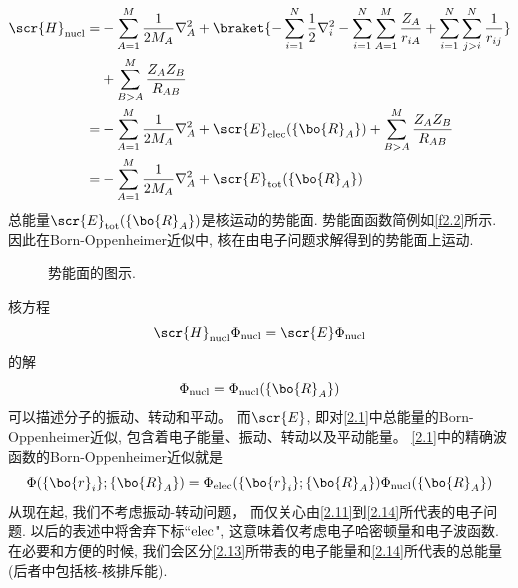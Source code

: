 \begin{equation}
\begin{split}
\scr{H}_{\rm nucl}= &- \sum_{A=1}^{M}\frac{1}{2M_A}\nabla_A^2 + \braket{-\sum_{i=1}^{N}\frac{1}{2}\nabla_i^2 - \sum_{i=1}^{N}\sum_{A=1}^{M}\frac{Z_A}{r_{iA}} + \sum_{i=1}^{N}\sum_{j>i}^{N}\frac{1}{r_{ij}}}\\
& + \sum_{B>A}^M\frac{Z_AZ_B}{R_{AB}}\\
= & - \sum_{A=1}^{M}\frac{1}{2M_A}\nabla_A^2 + \scr{E}_{\rm elec}(\{\bo{R}_A\}) + \sum_{B>A}^M\frac{Z_AZ_B}{R_{AB}}\\
= & - \sum_{A=1}^{M}\frac{1}{2M_A}\nabla_A^2 + \scr{E}_{\rm tot}(\{\bo{R}_A\})
\end{split}
\end{equation}
总能量$ \scr{E}_{\rm tot}(\{\bo{R}_A\}) $是核运动的势能面. 
势能面函数简例如\autoref{f2.2}所示. 
因此在Born-Oppenheimer近似中, 
核在由电子问题求解得到的势能面上运动. 

\begin{figure}[ht]
	\def\FunctionA(#1){180*((0.6/(#1+.5))^(12) -(0.6/(#1+ .5))^(6)) + 60}
	\def\FunctionF(#1){(#1)^3- 3*(#1)}
	\caption{势能面的图示.}
	\label{f2.2}
\end{figure}
核\sch 方程
\begin{equation}
\scr{H}_{\rm nucl}\Phi_{\rm nucl} = \scr{E}\Phi_{\rm nucl}
\end{equation}的解
\begin{equation}
\Phi_{\rm nucl}=\Phi_{\rm nucl}(\{\bo{R}_A\})
\end{equation}
可以描述分子的振动、转动和平动。
而$\scr{E}$, 
即对\autoref{2.1}中总能量的Born-Oppenheimer近似,
包含着电子能量、振动、转动以及平动能量。
\autoref{2.1}中的精确波函数的Born-Oppenheimer近似就是
\begin{equation}
\Phi(\{\bo{r}_i\};\{\bo{R}_A\}) = \Phi_{\rm elec}(\{\bo{r}_i\};\{\bo{R}_A\})\Phi_{\rm nucl}(\{\bo{R}_A\})
\end{equation}
从现在起,
我们不考虑振动-转动问题，
而仅关心由\autoref{2.11}到\autoref{2.14}所代表的电子问题.
以后的表述中将舍弃下标``$\rm elec$", 
这意味着仅考虑电子哈密顿量和电子波函数. 
在必要和方便的时候, 
我们会区分\autoref{2.13}所带表的电子能量和\autoref{2.14}所代表的总能量 (后者中包括核-核排斥能).


